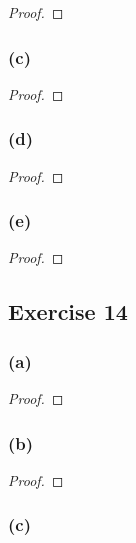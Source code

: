 \documentclass[14pt]{extarticle}
\begin{document}
\begin{proof}

\end{proof}

\subsubsection{(c)}

\begin{proof}

\end{proof}

\subsubsection{(d)}

\begin{proof}

\end{proof}

\subsubsection{(e)}

\begin{proof}

\end{proof}

\subsection{Exercise 14}

\subsubsection{(a)}

\begin{proof}

\end{proof}

\subsubsection{(b)}

\begin{proof}

\end{proof}

\subsubsection{(c)}
\end{document}

